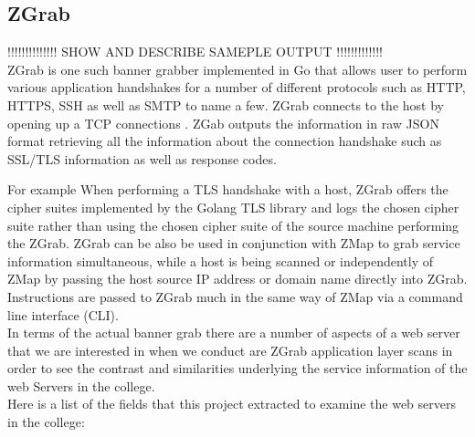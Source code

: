 \documentclass[a4wide,leqno,12pt]{report}
\begin{document}
\subsection{ZGrab}
!!!!!!!!!!!!!! SHOW AND DESCRIBE SAMEPLE OUTPUT !!!!!!!!!!!!!\\

ZGrab is one such banner grabber implemented in Go \cite{pike2009go} that allows user to perform various application handshakes for a number of different protocols such as HTTP, HTTPS, SSH \cite{ylonen2006secure} as well as SMTP\cite{2012smtp} to name a few. ZGrab connects to the host by opening up a TCP connections \cite{durumeric2015search}. ZGab outputs the information in raw JSON format retrieving all the information about the connection handshake such as SSL/TLS information as well as response codes.

For example When performing a TLS handshake with a host, ZGrab offers the cipher suites implemented by the Golang TLS library and logs the chosen cipher suite\cite{durumeric2015search} rather than using the chosen cipher suite of the source machine performing the ZGrab. ZGrab can be also be used in conjunction with ZMap to grab service information simultaneous, while a host is being scanned or independently of ZMap by passing the host source IP address or domain name directly into ZGrab. Instructions are passed to ZGrab much in the same way of ZMap via a command line interface (CLI).\\

In terms of the actual banner grab there are a number of aspects of a web server that we are interested in when we conduct are ZGrab application layer scans in order to see the contrast and similarities underlying the service information of the web Servers in the college.\\
Here is a list of the fields that this project extracted to examine the web servers in the college:
\end{document}
